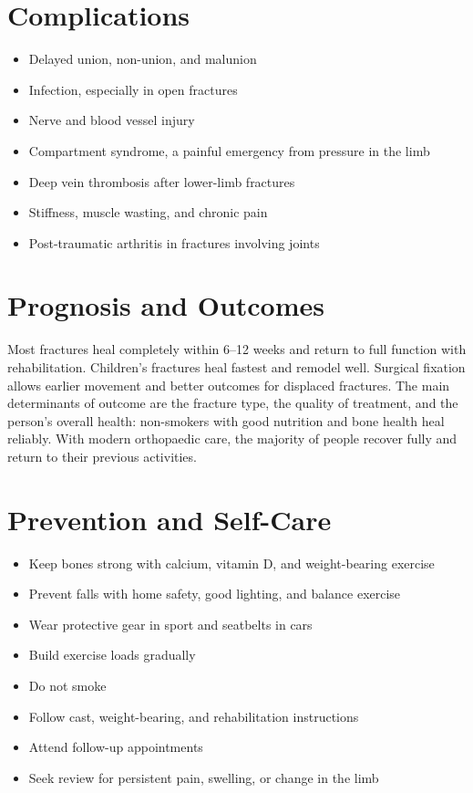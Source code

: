 \section*{Complications}
\begin{itemize}
    \item Delayed union, non-union, and malunion
    \item Infection, especially in open fractures
    \item Nerve and blood vessel injury
    \item Compartment syndrome, a painful emergency from pressure in the limb
    \item Deep vein thrombosis after lower-limb fractures
    \item Stiffness, muscle wasting, and chronic pain
    \item Post-traumatic arthritis in fractures involving joints
\end{itemize}

\section*{Prognosis and Outcomes}
Most fractures heal completely within 6--12 weeks and return to full function with rehabilitation. Children's fractures heal fastest and remodel well. Surgical fixation allows earlier movement and better outcomes for displaced fractures. The main determinants of outcome are the fracture type, the quality of treatment, and the person's overall health: non-smokers with good nutrition and bone health heal reliably. With modern orthopaedic care, the majority of people recover fully and return to their previous activities.

\section*{Prevention and Self-Care}
\begin{itemize}
    \item Keep bones strong with calcium, vitamin D, and weight-bearing exercise
    \item Prevent falls with home safety, good lighting, and balance exercise
    \item Wear protective gear in sport and seatbelts in cars
    \item Build exercise loads gradually
    \item Do not smoke
    \item Follow cast, weight-bearing, and rehabilitation instructions
    \item Attend follow-up appointments
    \item Seek review for persistent pain, swelling, or change in the limb
\end{itemize}

